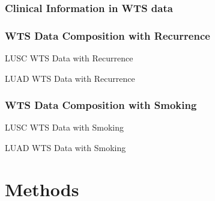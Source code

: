 \documentclass{beamer}
\begin{document}
    \subsubsection{Clinical Information in WTS data}
    \begin{frame}[allowframebreaks]
        \frametitle{WTS Data Composition with Recurrence}

        \begin{table}
            \caption{LUSC WTS Data with Recurrence}
            
        \end{table}

        \begin{table}
            \caption{LUAD WTS Data with Recurrence}
            
        \end{table}
    \end{frame}

    \begin{frame}[allowframebreaks]
        \frametitle{WTS Data Composition with Smoking}

        \begin{table}
            \caption{LUSC WTS Data with Smoking}
            \resizebox{!}{0.3 \textheight}
            {}
        \end{table}

        \begin{table}
            \caption{LUAD WTS Data with Smoking}
            \resizebox{!}{0.3 \textheight}
            {}
        \end{table}
    \end{frame}

    \section{Methods}
\end{document}
